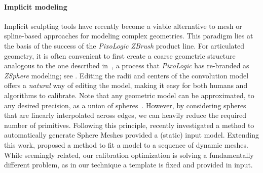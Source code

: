 \paragraph{Implicit modeling}
Implicit sculpting tools have recently become a viable alternative to mesh or spline-based approaches for modeling complex geometries. This paradigm lies at the basis of the success of the \emph{PixoLogic ZBrush} product line. 
For articulated geometry, it is often convenient to first create a coarse geometric structure analogous to the one described in~, a process that \emph{PixoLogic} has re-branded as \emph{ZSphere{}} modeling; see . Editing the radii and centers of the convolution model offers a \emph{natural} way of editing the model, making it easy for both humans and algorithms to calibrate.
Note that any geometric model can be approximated, to any desired precision, as a union of spheres~\cite{tagliasacchi2016skeletons}. 
However, by considering spheres that are linearly interpolated across edges, we can heavily reduce the required number of primitives. Following this principle, \cite{thiery2013sphere} recently investigated a method to automatically generate Sphere Meshes provided a  (static) input model. Extending this work, \cite{thiery2016spheremesh} proposed a method to fit a model to a sequence of dynamic meshes. 
% 
While seemingly related, our calibration optimization is solving a fundamentally different problem, as in our technique a template is fixed and provided in input.

\endinput


